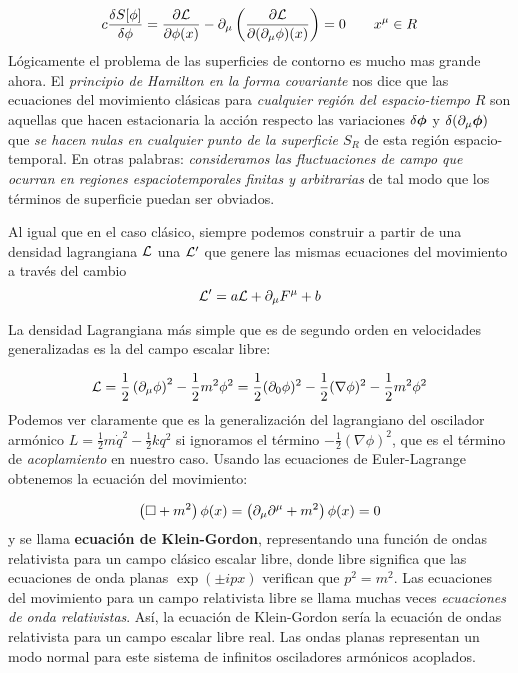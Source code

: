\begin{equation}
	c \frac{\delta S[\phi]}{\delta \phi} = \frac{\partial \mathcal{L}}{\partial \phi(x)} - \partial_\mu \left( \frac{\partial \mathcal{L}}{\partial (\partial_\mu \phi)(x)} \right) = 0 \qquad x^{\mu} \in R
\end{equation}
Lógicamente el problema de las superficies de contorno es mucho mas grande ahora. El \textit{principio de Hamilton en la forma covariante} nos dice que las ecuaciones del movimiento clásicas para \textit{cualquier región del espacio-tiempo} $R$ son aquellas que hacen estacionaria la acción respecto las variaciones $\delta \boldsymbol{\phi}$ y $\delta (\partial_\mu \boldsymbol{\phi})$ que \textit{se hacen nulas en cualquier punto de la superficie $S_R$} de esta región espacio-temporal. En otras palabras: \textit{consideramos las fluctuaciones de campo que ocurran en regiones espaciotemporales finitas y arbitrarias} de tal modo que los términos de superficie puedan ser obviados. 

Al igual que en el caso clásico, siempre podemos construir a partir de una densidad lagrangiana $\mathcal{L}$ una $\mathcal{L}'$ que genere las mismas ecuaciones del movimiento a través del cambio 
\begin{equation}
	\mathcal{L}' = a\mathcal{L} + \partial_\mu F^\mu + b
\end{equation}


\begin{ejemplo}
	La densidad Lagrangiana más simple que es de segundo orden en velocidades generalizadas es la del campo escalar libre:
	
	\begin{equation}
		\mathcal{L} = \frac{1}{2} \left( \partial_\mu \phi \right)^2 - \frac{1}{2} m^2 \phi^2 = \frac{1}{2}( \partial_0 \phi)^2 - \frac{1}{2} (\nabla \phi)^2 - \frac{1}{2} m^2 \phi^2
	\end{equation}
	Podemos ver claramente que es la generalización del lagrangiano del oscilador armónico $L=\frac{1}{2}m\dot{q}^2 - \frac{1}{2}kq^2$ si ignoramos el término $-\frac{1}{2}(\nabla\phi)^2$, que es el término de \textit{acoplamiento} en nuestro caso. Usando las ecuaciones de Euler-Lagrange obtenemos la ecuación del movimiento:
	
	\begin{equation}
		\left( \square + m^2  \right)\phi(x) = \left( \partial_\mu \partial^\mu + m^2 \right) \phi (x) = 0
	\end{equation}
	y se llama \textbf{ecuación de Klein-Gordon}, representando una función de ondas relativista para un campo clásico escalar libre, donde libre significa que las ecuaciones de onda planas $\exp (\pm i px)$ verifican que $p^2 = m^2$. Las ecuaciones del movimiento para un campo relativista libre se llama muchas veces \textit{ecuaciones de onda relativistas}. Así, la ecuación de Klein-Gordon sería la ecuación de ondas relativista para un campo escalar libre real. Las ondas planas representan un modo normal para este sistema de infinitos osciladores armónicos acoplados. 
\end{ejemplo}


